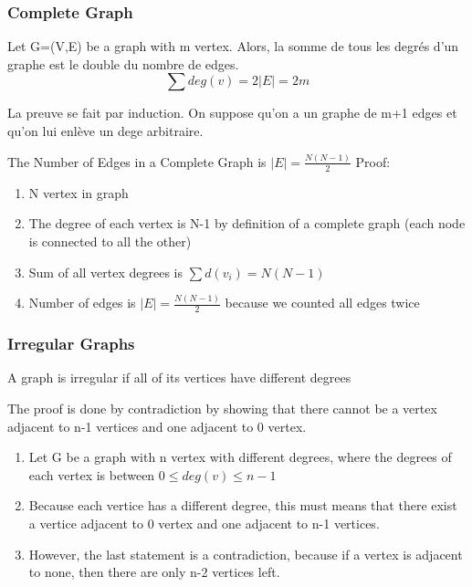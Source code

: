\documentclass{article}
\begin{document}
\subsubsection{Complete Graph}%
\label{ssub:Complete Graph}

\begin{theorem}
    Let G=(V,E) be a graph with m vertex. Alors, la somme de tous les
    degrés d'un graphe est le double du nombre de edges.
    $$ \sum deg(v) = 2 |E| = 2m$$
\end{theorem}

\begin{remark}
    La preuve se fait par induction. On suppose qu'on a un graphe de m+1
    edges et qu'on lui enlève un dege arbitraire.
\end{remark}

\begin{theorem}
    The Number of Edges in a Complete Graph is $ |E| = \frac{N(N-1)}{2} $
    Proof:
    \begin{enumerate}
	\item N vertex in graph
	\item The degree of each vertex is N-1 by definition of a complete
	    graph (each node is connected to all the other)
	\item Sum of all vertex degrees is $\sum d(v_i) = N(N-1)$
	\item Number of edges is $ |E| = \frac{N(N-1)}{2} $ because we
	    counted all edges twice
    \end{enumerate}
\end{theorem}

\subsubsection{Irregular Graphs}%
\label{ssub:Irregular Graphs}

\begin{definition}
    A graph is irregular if all of its vertices have different degrees
\end{definition}

\begin{proposition}
    The proof is done by contradiction by showing that there cannot be
    a vertex adjacent to n-1 vertices and one adjacent to 0 vertex.
    \begin{enumerate}
        \item Let G be a graph with n vertex with different degrees,
	    where the degrees of each vertex is between
	    $ 0 \leq deg(v) \leq n-1$
	\item Because each vertice has a different degree, this must means
	    that there exist a vertice adjacent to 0 vertex and one
	    adjacent to n-1 vertices.
	\item However, the last statement is a contradiction, because if
	    a vertex is adjacent to none, then there are only n-2 vertices
	    left.
    \end{enumerate}
\end{proposition}
\end{document}
